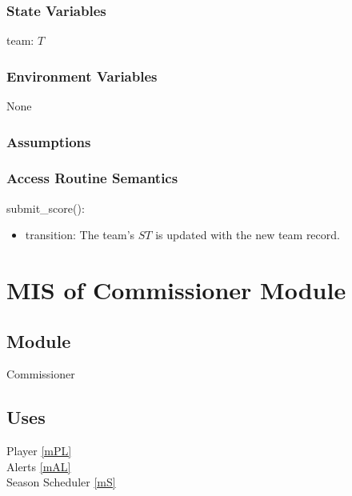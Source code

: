 \documentclass[12pt, titlepage]{article}
\begin{document}
\subsubsection{State Variables}

team: $T$

\subsubsection{Environment Variables}

None

\subsubsection{Assumptions}


\subsubsection{Access Routine Semantics}

\noindent submit\_score():
\begin{itemize}
\item transition: The team's $ST$ is updated with the new team record.
\end{itemize}

\newpage

\section{MIS of Commissioner Module} \label{mCM}



\subsection{Module}

Commissioner

\subsection{Uses}

Player \ref{mPL}\\
Alerts \ref{mAL}\\
Season Scheduler \ref{mS}
\end{document}
